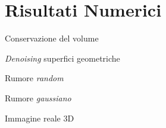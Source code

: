 \section{Risultati Numerici}
\begin{frame}{Conservazione del volume}

\end{frame}

\begin{frame}{\emph{Denoising} superfici geometriche}

\end{frame}

\begin{frame}{Rumore \emph{random}}

\end{frame}

\begin{frame}{Rumore \emph{gaussiano}}

\end{frame}

\begin{frame}{Immagine reale 3D}

\end{frame}
